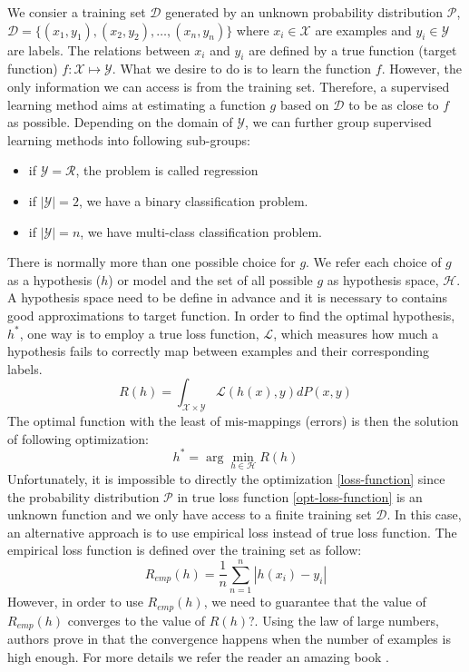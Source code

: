 We consier a training set $\mathcal{D}$ generated by an unknown probability distribution $\mathcal{P}$,  $\mathcal{D} = \lbrace (x_1, y_1), (x_2, y_2),\ldots, (x_n, y_n)  \rbrace$ where $x_i \in \mathcal{X}$ are examples and $y_i \in \mathcal{Y}$ are labels. The relations between $x_i$ and $y_i$ are defined by a true function (target function) $f: \mathcal{X}\longmapsto \mathcal{Y}$. What we desire to do is to learn the function $f$. However, the only information we can access is from the training set. Therefore, a supervised learning method aims at estimating a function $g$ based on $\mathcal{D}$ to be as close to $f$ as possible. Depending on the domain of $\mathcal{Y}$, we can further group supervised learning methods into following sub-groups:
\begin{itemize}
	\item if $\mathcal{Y} = \mathcal{R}$, the problem is called regression
	\item if $|\mathcal{Y}| = 2$, we have a binary classification problem.
	\item if $|\mathcal{Y}| = n$, we have multi-class classification problem.
\end{itemize}

There is normally more than one possible choice for $g$. We refer each choice of $g$ as a hypothesis ($h$) or model and the set of all possible $g$ as hypothesis space, $\mathcal{H}$. A hypothesis space need to be define in advance and it is necessary to contains good approximations to target function. In order to find the optimal hypothesis, $h^*$, one way is to employ a true loss function, $\mathcal{L}$, which measures how much a hypothesis fails to correctly map between examples and their corresponding labels.
\begin{equation}
\label{loss-function}
R(h) = \int_{\mathcal{X}\times \mathcal{Y}}^{} \mathcal{L}(h(x),y)dP(x,y)
\end{equation}
The optimal function with the least of mis-mappings (errors) is then the solution of following optimization:
\begin{equation}
\label{opt-loss-function}
h^{*} = \arg\min_{h \in \mathcal{H}}R(h)
\end{equation}
Unfortunately, it is impossible to directly the optimization \ref{loss-function} since the probability distribution $\mathcal{P}$ in true loss function \ref{opt-loss-function} is an unknown function and we only have access to a finite training set $\mathcal{D}$. In this case, an alternative approach is to use empirical loss instead of true loss function. The empirical loss function is defined over the training set as follow:
\begin{equation}
R_{emp}(h) = \frac{1}{n} \sum_{n=1}^{n} |h(x_i) - y_i| 
\end{equation}
However, in order to use $R_{emp}(h)$, we need to guarantee that the value of $R_{emp}(h)$ converges to the value of $R(h)$?. Using the law of large numbers, authors prove in \cite{vapnik1998statistical} that the convergence happens when the number of examples is high enough. For more details we refer the reader an amazing book \cite{vapnik1998statistical}.
